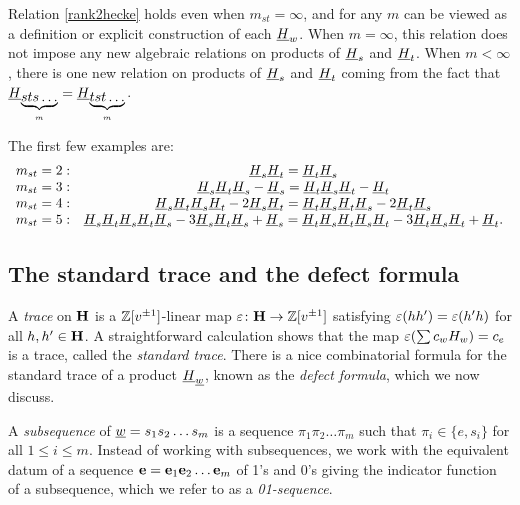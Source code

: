 Relation \eqref{rank2hecke} holds even when $m_{st}=\infty$, and for any $m$ can be viewed as a definition or explicit construction of each $\underline{H}_w$. When $m=\infty$, this relation does not
impose any new algebraic relations on products of $\underline{H}_s$ and $\underline{H}_t$. When $m < \infty$, there is one new relation on products of $\underline{H}_s$ and $\underline{H}_t$ coming from the fact that $\underline{H}_{\underbrace{sts\ldots}_{m}} = \underline{H}_{\underbrace{tst\ldots}_{m}}$.

\begin{ex} \label{rank2heckeEx} The first few examples are: \[\begin{array}{lc} m_{st}=2: & \underline{H}_s\underline{H}_t=\underline{H}_t\underline{H}_s \\ m_{st}=3: & \underline{H}_s\underline{H}_t\underline{H}_s-\underline{H}_s=\underline{H}_t\underline{H}_s\underline{H}_t-\underline{H}_t\\ m_{st}=4: & \underline{H}_s\underline{H}_t\underline{H}_s\underline{H}_t-2\underline{H}_s\underline{H}_t = \underline{H}_t\underline{H}_s\underline{H}_t\underline{H}_s - 2 \underline{H}_t \underline{H}_s \\ m_{st}=5: & \underline{H}_s\underline{H}_t\underline{H}_s\underline{H}_t\underline{H}_s - 3
\underline{H}_s\underline{H}_t\underline{H}_s + \underline{H}_s = \underline{H}_t\underline{H}_s\underline{H}_t\underline{H}_s\underline{H}_t - 3 \underline{H}_t \underline{H}_s\underline{H}_t + \underline{H}_t. \end{array} \] \end{ex}

\subsection{The standard trace and the defect formula}
\label{subsec-defectformula}

A \emph{trace} on ${\mathbf H}$ is a ${\mathbb{Z}}[v^{\pm 1}]$-linear map $\varepsilon \colon {\mathbf H} \rightarrow {\mathbb{Z}}[v^{\pm 1}]$ satisfying $\varepsilon(hh') = \varepsilon(h'h)$ for all $h,h' \in {\mathbf H}$. A straightforward calculation shows that the map $\varepsilon(\sum c_w
H_w) = c_e$ is a trace, called the \emph{standard trace}. There is a nice combinatorial formula for the standard trace of a product $\underline{H}_{\underline{w}}$, known
as the \emph{defect formula}, which we now discuss.

A \emph{subsequence} of $\underline{w} = s_1s_2\dots s_m$ is a sequence $\pi_1 \pi_2 \dots \pi_m$ such that $\pi_i \in \{ e, s_i \}$ for all $1 \le i \le m$. Instead of working with subsequences,
we work with the equivalent datum of a sequence ${\mathbf e} = {\mathbf e}_1 {\mathbf e}_2 \dots {\mathbf e}_m$ of 1's and 0's giving the indicator function of a subsequence, which we refer to as a \emph{01-sequence}.

